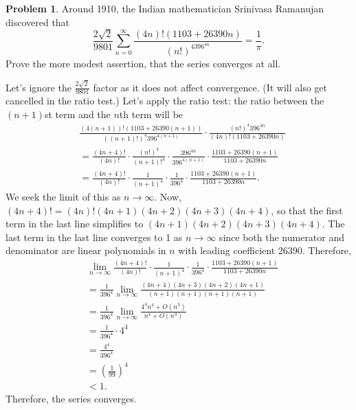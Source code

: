 \documentclass[11pt,oneside]{amsart}
\theoremstyle{definition}
\newtheorem{problem}{Problem}
\theoremstyle{plain}
\begin{document}
\begin{problem}
Around 1910, the Indian mathematician Srinivasa Ramanujan discovered that
\[
  \frac{2\sqrt{2}}{9801}\sum_{n=0}^\infty\frac{(4n)!(1103+26390n)}{(n!)^4396^{4n}}=\frac{1}{\pi}.
\]
Prove the more modest assertion, that the series converges at all.
\end{problem}
\begin{solution}
  Let's ignore the $\frac{2\sqrt 2}{9801}$ factor as it does not affect convergence. (It will also get cancelled in the ratio test.) Let's apply the ratio test: the ratio between the $(n+1)$st term and the $n$th term will be
  \[\begin{split}
    &\frac{(4(n+1))!(1103+26390(n+1))}{((n+1)!)^4 396^{4(n+1)}}\cdot \frac{(n!)^4 396^{4n}}{(4n)!(1103+26390n)}\\
    &=\frac{(4n+4)!}{(4n)!}\cdot\frac{(n!)^4}{(n+1)!^4}\cdot\frac{396^{4n}}{396^{4(n+1)}}\cdot\frac{1103+26390(n+1)}{1103+26390n}\\
    &=\frac{(4n+4)!}{(4n)!}\cdot \frac 1{(n+1)^4}\cdot \frac 1{396^4}\cdot \frac{1103+26390(n+1)}{1103+26390n}.
  \end{split}\]
  We seek the limit of this as $n\to\infty$. Now, $(4n+4)! =(4n)!(4n+1)(4n+2)(4n+3)(4n+4)$, so that the first term in the last line simplifies to $(4n+1)(4n+2)(4n+3)(4n+4)$. The last term in the last line converges to 1 as $n\to\infty$ since both the numerator and denominator are linear polynomials in $n$ with leading coefficient 26390. Therefore,
  \[\begin{split}
    &\lim_{n\to\infty}\frac{(4n+4)!}{(4n)!}\cdot \frac 1{(n+1)^4}\cdot \frac 1{396^4}\cdot \frac{1103+26390(n+1)}{1103+26390n}\\
    &= \frac 1{396^4}\lim_{n\to\infty}\frac{(4n+4)(4n+3)(4n+2)(4n+1)}{(n+1)(n+1)(n+1)(n+1)}\\
    &= \frac 1{396^4}\lim_{n\to\infty}\frac{4^4 n^4+O(n^3)}{n^4+O(n^3)}\\
    &= \frac 1{396^4}\cdot 4^4\\
    &= \frac{4^4}{396^4}\\
    &= \left(\frac 1{99}\right)^4\\
    &<1.
  \end{split}\]
  Therefore, the series converges.
\end{solution}
\end{document}
